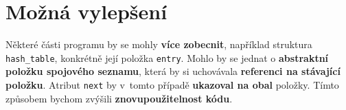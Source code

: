 \documentclass[12pt]{report}
\begin{document}
	\section{Možná vylepšení}
	Některé části programu by se mohly \textbf{více zobecnit}, například struktura \texttt{hash\_table}, konkrétně její položka \texttt{entry}. Mohlo by se jednat o \textbf{abstraktní položku spojového seznamu}, která by si uchovávala \textbf{referenci na stávající položku}. Atribut \texttt{next} by v~tomto případě \textbf{ukazoval na obal} položky. Tímto způsobem bychom zvýšili \textbf{znovupoužitelnost kódu}.
	
\end{document}
